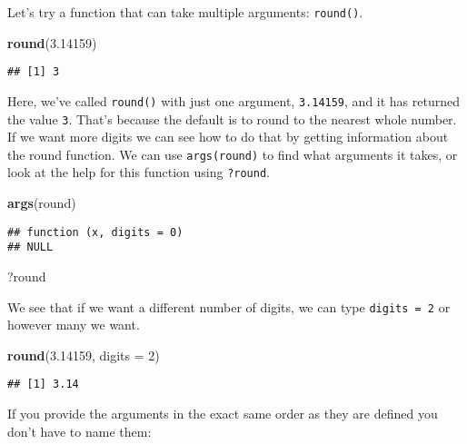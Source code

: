 \documentclass[]{book}
\newenvironment{Shaded}{\begin{snugshade}}{\end{snugshade}}
\newcommand{\KeywordTok}[1]{\textcolor[rgb]{0.13,0.29,0.53}{\textbf{#1}}}
\newcommand{\DataTypeTok}[1]{\textcolor[rgb]{0.13,0.29,0.53}{#1}}
\newcommand{\DecValTok}[1]{\textcolor[rgb]{0.00,0.00,0.81}{#1}}
\newcommand{\FloatTok}[1]{\textcolor[rgb]{0.00,0.00,0.81}{#1}}
\newcommand{\NormalTok}[1]{#1}
\begin{document}
Let's try a function that can take multiple arguments: \texttt{round()}.

\begin{Shaded}
\begin{Highlighting}[]
\KeywordTok{round}\NormalTok{(}\FloatTok{3.14159}\NormalTok{)}
\end{Highlighting}
\end{Shaded}

\begin{verbatim}
## [1] 3
\end{verbatim}

Here, we've called \texttt{round()} with just one argument,
\texttt{3.14159}, and it has returned the value \texttt{3}. That's
because the default is to round to the nearest whole number. If we want
more digits we can see how to do that by getting information about the
round function. We can use \texttt{args(round)} to find what arguments
it takes, or look at the help for this function using \texttt{?round}.

\begin{Shaded}
\begin{Highlighting}[]
\KeywordTok{args}\NormalTok{(round)}
\end{Highlighting}
\end{Shaded}

\begin{verbatim}
## function (x, digits = 0) 
## NULL
\end{verbatim}

\begin{Shaded}
\begin{Highlighting}[]
\NormalTok{?round}
\end{Highlighting}
\end{Shaded}

We see that if we want a different number of digits, we can type
\texttt{digits\ =\ 2} or however many we want.

\begin{Shaded}
\begin{Highlighting}[]
\KeywordTok{round}\NormalTok{(}\FloatTok{3.14159}\NormalTok{, }\DataTypeTok{digits =} \DecValTok{2}\NormalTok{)}
\end{Highlighting}
\end{Shaded}

\begin{verbatim}
## [1] 3.14
\end{verbatim}

If you provide the arguments in the exact same order as they are defined
you don't have to name them:
\end{document}
